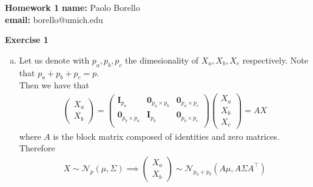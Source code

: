 \documentclass[10pt,notitlepage]{article}
\newcommand{\MBlue}[1]{{\color{MBlue}#1}}
\newcommand{\Id}{\mathbf{I}}
\newcommand{\ZeroM}{\mathbf{0}}
\begin{document}
	\begin{center}
		\huge{\MBlue{\textbf{Homework 1}}}		
		\vskip20pt
		\large{
			\textbf{name:} Paolo Borello\\
            \textbf{email:} borello@umich.edu}
	\end{center}

    \vskip20pt
    \noindent
    \textbf{\large \MBlue{Exercise 1}}
    \vskip10pt
    \noindent
	\begin{exercise}[Solution]
        \begin{enumerate}[(a)]
            \item Let us denote with $p_a, p_b, p_c$ the dimesionality of $X_a, X_b, X_c$ respectively. Note that $p_a+p_b+p_c=p$.\\
                    Then we have that
                    \begin{align*}
                        \begin{pmatrix}
                            X_a\\
                            X_b
                        \end{pmatrix} = 
                        \begin{pmatrix}
                            \Id_{p_a} & \ZeroM_{p_a\times p_b} & \ZeroM_{p_a\times p_c}\\
                            \ZeroM_{p_b\times p_a} & \Id_{p_b} & \ZeroM_{p_b\times p_c}\\
                        \end{pmatrix}
                        \begin{pmatrix}
                            X_a\\
                            X_b\\
                            X_c
                        \end{pmatrix}
                        = AX
                    \end{align*}
                    where $A$ is the block matrix composed of identities and zero matrices. Therefore
                    \begin{align*}
                        X\sim\mathcal{N}_p\left(\mu,\Sigma\right)\implies 
                        \begin{pmatrix}
                            X_a\\
                            X_b
                        \end{pmatrix}
                        \sim\mathcal{N}_{p_a+p_b}\left(A\mu,A\Sigma A^\top\right)

\end{align*}
\end{enumerate}
\end{exercise}
\end{document}
